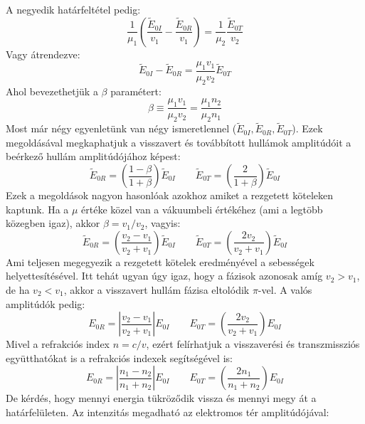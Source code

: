 \documentclass[a4paper,12pt]{article}
\begin{document}
A negyedik határfeltétel pedig:
\begin{equation}
    \frac{1}{\mu_1} \left( \frac{\tilde{E}_{0I}}{v_1} - \frac{\tilde{E}_{0R}}{v_1} \right) = \frac{1}{\mu_2} \frac{\tilde{E}_{0T}}{v_2}
\end{equation}
Vagy átrendezve:
\begin{equation}
    \tilde{E}_{0I} - \tilde{E}_{0R} = \frac{\mu_1 v_1}{\mu_2 v_2} \tilde{E}_{0T}
\end{equation}
Ahol bevezethetjük a $\beta$ paramétert:
\begin{equation}
    \beta \equiv \frac{\mu_1 v_1}{\mu_2 v_2} = \frac{\mu_1 n_2}{\mu_2 n_1}
\end{equation}
Most már négy egyenletünk van négy ismeretlennel ($\tilde{E}_{0I}, \tilde{E}_{0R}, \tilde{E}_{0T}$). Ezek megoldásával megkaphatjuk a visszavert és továbbított hullámok amplitúdóit a beérkező hullám amplitúdójához képest:
\begin{equation}
    \tilde{E}_{0R} = \left(\frac{1 - \beta}{1 + \beta}\right) \tilde{E}_{0I} \qquad \tilde{E}_{0T} = \left(\frac{2}{1 + \beta}\right) \tilde{E}_{0I}
\end{equation}
Ezek a megoldások nagyon hasonlóak azokhoz amiket a rezgetett köteleken kaptunk. Ha a $\mu$ értéke közel van a vákuumbeli értékéhez (ami a legtöbb közegben igaz), akkor $\beta = v_1/v_2$, vagyis:
\begin{equation}
    \tilde{E}_{0R} = \left(\frac{v_2 - v_1}{v_2 + v_1}\right) \tilde{E}_{0I} \qquad \tilde{E}_{0T} = \left(\frac{2 v_2}{v_2 + v_1}\right) \tilde{E}_{0I}
\end{equation}
Ami teljesen megegyezik a rezgetett kötelek eredményével a sebességek helyettesítésével. Itt tehát ugyan úgy igaz, hogy a fázisok azonosak amíg $v_2 > v_1$, de ha $v_2 < v_1$, akkor a visszavert hullám fázisa eltolódik $\pi$-vel.
A valós amplitúdók pedig:
\begin{equation}
    E_{0R} = \left|\frac{v_2 - v_1}{v_2 + v_1}\right| E_{0I} \qquad E_{0T} = \left(\frac{2 v_2}{v_2 + v_1}\right) E_{0I}
\end{equation}
Mivel a refrakciós index $n = c/v$, ezért felírhatjuk a visszaverési és transzmissziós együtthatókat is a refrakciós indexek segítségével is:
\begin{equation}
    E_{0R} = \left|\frac{n_1 - n_2}{n_1 + n_2}\right| E_{0I} \qquad E_{0T} = \left(\frac{2 n_1}{n_1 + n_2}\right) E_{0I}
\end{equation}
De kérdés, hogy mennyi energia tükröződik vissza és mennyi megy át a határfelületen. Az intenzitás megadható az elektromos tér amplitúdójával:
\end{document}
